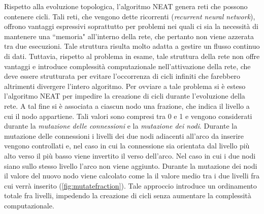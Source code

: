 Rispetto alla evoluzione topologica, l'algoritmo NEAT genera reti che possono
contenere cicli. Tali reti, che vengono dette ricorrenti (\emph{recurrent neural
network}), offrono vantaggi espressivi soprattutto per problemi nei quali ci sia
la necessità di mantenere una ``memoria" all'interno della rete, che pertanto
non viene azzerata tra due esecuzioni. Tale struttura risulta molto adatta a
gestire un flusso continuo di dati. Tuttavia, rispetto al problema in esame,
tale struttura della rete non offre vantaggi e introduce complessità
computazionale nell'attivazione della rete, che deve essere strutturata per
evitare l'occorrenza di cicli infiniti che farebbero altrimenti divergere
l'intero algoritmo. Per ovviare a tale problema si è esteso l'algoritmo NEAT per
impedire la creazione di cicli durante l'evoluzione della rete. A tal fine si è
associata a ciascun nodo una frazione, che indica il livello a cui il nodo
appartiene. Tali valori sono compresi tra 0 e 1 e vengono considerati durante
la \emph{mutazione delle connessioni} e la \emph{mutazione dei nodi}. Durante la
mutazione delle connessioni i livelli dei due nodi adiacenti all'arco da inserire
vengono controllati e, nel caso in cui la connessione sia orientata dal livello
più alto verso il più basso viene invertito il verso dell'arco. Nel caso in cui
i due nodi siano sullo stesso livello l'arco non viene aggiunto. Durante la
mutazione dei nodi il valore del nuovo nodo viene calcolato come la il valore
medio tra i due livelli fra cui verrà inserito (\cref{fig:mutatefraction}).
Tale approccio introduce un ordinamento totale fra livelli, impedendo la
creazione di cicli senza aumentare la complessità computazionale.


